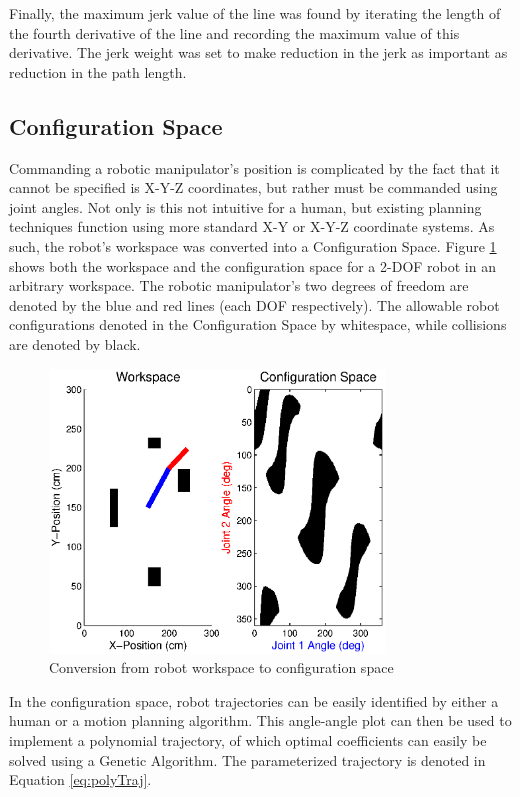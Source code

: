 Finally, the maximum jerk value of the line was found by iterating the length of the fourth derivative of the line and recording the maximum value of this derivative. The jerk weight was set to make reduction in the jerk as important as reduction in the path length.

\subsection{Configuration Space}
Commanding a robotic manipulator's position is complicated by the fact that it cannot be specified is X-Y-Z coordinates, but rather must be commanded using joint angles. Not only is this not intuitive for a human, but existing planning techniques function using more standard X-Y or X-Y-Z coordinate systems. As such, the robot's workspace was converted into a Configuration Space. Figure \ref{fig:ws2cs} shows both the workspace and the configuration space for a 2-DOF robot in an arbitrary workspace. The robotic manipulator's two degrees of freedom are denoted by the blue and red lines (each DOF respectively). The allowable robot configurations denoted in the Configuration Space by whitespace, while collisions are denoted by black.

\begin{figure}[h]
	\centering
	\includegraphics[width=3.5in]{./figures/wp2cs.eps}
	\caption{Conversion from robot workspace to configuration space }
	\label{fig:ws2cs}
\end{figure}

In the configuration space, robot trajectories can be easily identified by either a human or a motion planning algorithm. This angle-angle plot can then be used to implement a polynomial trajectory, of which optimal coefficients can easily be solved using a Genetic Algorithm. The parameterized trajectory is denoted in Equation \ref{eq:polyTraj}.

